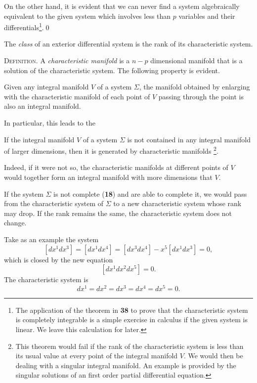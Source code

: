 On the other hand, it is evident that we can never find a system algebraically equivalent to the given system which involves less than $p$ variables and their differentials\footnote{The application of the theorem in \textsection\textbf{38} to prove that the characteristic system is completely integrable is a simple  exercise in calculus if the given system is linear. We leave this calculation for later.}.\qed

The \emph{class} of an exterior differential system is the rank of its characteristic system.


\vspace{12pt}\fsec \textsc{Definition.}  {A} \emph{characteristic manifold} {is a $n-p$ dimensional manifold that is a solution of the characteristic system. The following property is evident.}

\begin{thm*}
  Given any integral manifold $V$ of a system $\Sigma$, the manifold obtained by enlarging with the characteristic manifold of each point of $V$ passing through the point is also an integral manifold.
\end{thm*}

In particular, this leads to the 
\begin{thm*}
  If the integral manifold $V$ of a system $\Sigma$ is not contained in any integral manifold of larger dimensions, then it is generated by  characteristic manifolds \footnote{ This theorem would fail if the rank of the characteristic system is less than its usual value  at every point of the integral manifold $V$. We would then be dealing with a singular integral manifold. An example is provided by the singular solutions of an first order partial differential equation.}.
\end{thm*}

Indeed, if it were not so, the characteristic manifolds at  different points of $V$ would together form an integral manifold with more dimensions that $V$.

\vspace{12pt}\fsec If the system $\Sigma$ is not complete (\textsection\textbf{18}) and are able to complete it, we would pass from the characteristic system of $\Sigma$ to a new characteristic system whose rank may drop. If the rank remains the same, the characteristic system does not change.

Take as an example the system
\begin{equation}
  \label{eq:3.13}
  [dx^{1}dx^{3}]=[dx^{1}dx^{4}]=[dx^{3}dx^{4}]-x^{5}[dx^{1}dx^{3}]=0,
\end{equation}
which is closed by the new equation
\begin{equation}
  \label{eq:3.14}
  [dx^{1}dx^{2}dx^{5}]=0.
\end{equation}
The characteristic system is
\[
dx^{1}=dx^{2}=dx^{3}=dx^{4}=dx^{5}=0.
\]


